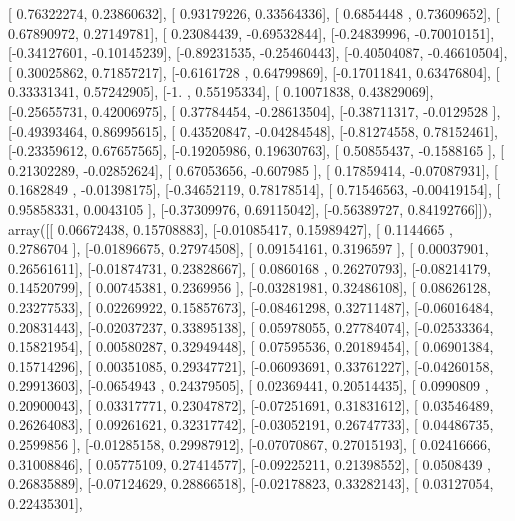 \documentclass{article}
\begin{document}
       [ 0.76322274,  0.23860632],
       [ 0.93179226,  0.33564336],
       [ 0.6854448 ,  0.73609652],
       [ 0.67890972,  0.27149781],
       [ 0.23084439, -0.69532844],
       [-0.24839996, -0.70010151],
       [-0.34127601, -0.10145239],
       [-0.89231535, -0.25460443],
       [-0.40504087, -0.46610504],
       [ 0.30025862,  0.71857217],
       [-0.6161728 ,  0.64799869],
       [-0.17011841,  0.63476804],
       [ 0.33331341,  0.57242905],
       [-1.        ,  0.55195334],
       [ 0.10071838,  0.43829069],
       [-0.25655731,  0.42006975],
       [ 0.37784454, -0.28613504],
       [-0.38711317, -0.0129528 ],
       [-0.49393464,  0.86995615],
       [ 0.43520847, -0.04284548],
       [-0.81274558,  0.78152461],
       [-0.23359612,  0.67657565],
       [-0.19205986,  0.19630763],
       [ 0.50855437, -0.1588165 ],
       [ 0.21302289, -0.02852624],
       [ 0.67053656, -0.607985  ],
       [ 0.17859414, -0.07087931],
       [ 0.1682849 , -0.01398175],
       [-0.34652119,  0.78178514],
       [ 0.71546563, -0.00419154],
       [ 0.95858331,  0.0043105 ],
       [-0.37309976,  0.69115042],
       [-0.56389727,  0.84192766]]), array([[ 0.06672438,  0.15708883],
       [-0.01085417,  0.15989427],
       [ 0.1144665 ,  0.2786704 ],
       [-0.01896675,  0.27974508],
       [ 0.09154161,  0.3196597 ],
       [ 0.00037901,  0.26561611],
       [-0.01874731,  0.23828667],
       [ 0.0860168 ,  0.26270793],
       [-0.08214179,  0.14520799],
       [ 0.00745381,  0.2369956 ],
       [-0.03281981,  0.32486108],
       [ 0.08626128,  0.23277533],
       [ 0.02269922,  0.15857673],
       [-0.08461298,  0.32711487],
       [-0.06016484,  0.20831443],
       [-0.02037237,  0.33895138],
       [ 0.05978055,  0.27784074],
       [-0.02533364,  0.15821954],
       [ 0.00580287,  0.32949448],
       [ 0.07595536,  0.20189454],
       [ 0.06901384,  0.15714296],
       [ 0.00351085,  0.29347721],
       [-0.06093691,  0.33761227],
       [-0.04260158,  0.29913603],
       [-0.0654943 ,  0.24379505],
       [ 0.02369441,  0.20514435],
       [ 0.0990809 ,  0.20900043],
       [ 0.03317771,  0.23047872],
       [-0.07251691,  0.31831612],
       [ 0.03546489,  0.26264083],
       [ 0.09261621,  0.32317742],
       [-0.03052191,  0.26747733],
       [ 0.04486735,  0.2599856 ],
       [-0.01285158,  0.29987912],
       [-0.07070867,  0.27015193],
       [ 0.02416666,  0.31008846],
       [ 0.05775109,  0.27414577],
       [-0.09225211,  0.21398552],
       [ 0.0508439 ,  0.26835889],
       [-0.07124629,  0.28866518],
       [-0.02178823,  0.33282143],
       [ 0.03127054,  0.22435301],
\end{document}
